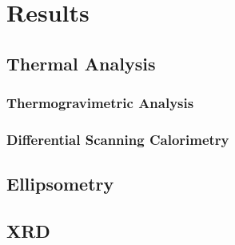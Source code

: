 \chapter{Results}
\label{ch:results}
\thispagestyle{empty}



\section{Thermal Analysis}
\label{chap:Results-Thermal}



\subsection{Thermogravimetric Analysis}



\subsection{Differential Scanning Calorimetry}


\section{Ellipsometry}
\label{chap:Results-Ellipsometry}

\lipsum


\section{XRD}
\label{chap:Results-XRD}

\lipsum








